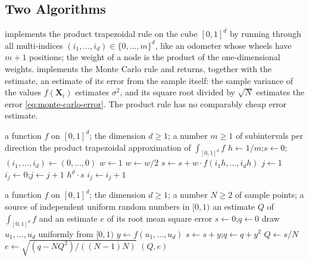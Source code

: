 \subsection{Two Algorithms}

 implements the product trapezoidal rule on the cube $[0,1]^d$ by running through all multi-indices $(i_1,\ldots,i_d)\in\{0,\ldots,m\}^d$, like an odometer whose wheels have $m+1$ positions; the weight of a node is the product of the one-dimensional weights.  implements the Monte Carlo rule and returns, together with the estimate, an estimate of its error from the sample itself: the sample variance of the values $f(\mathbf X_i)$ estimates $\sigma^2$, and its square root divided by $\sqrt N$ estimates the error \eqref{eq:monte-carlo-error}. The product rule has no comparably cheap error estimate.

\begin{algorithm}
\begin{algorithmic}[1]
\Require a function $f$ on $[0,1]^d$; the dimension $d\ge1$; a number $m\ge1$ of subintervals per direction
\Ensure the product trapezoidal approximation of $\int_{[0,1]^d}f$
\State $h\gets1/m$;\quad $s\gets0$;\quad $(i_1,\ldots,i_d)\gets(0,\ldots,0)$
\Loop
  \State $w\gets1$
     $w\gets w/2$ 
    \EndIf
  \EndFor
  \State $s\gets s+w\cdot f(i_1h,\ldots,i_dh)$
  \State $j\gets1$ 
    \State $i_j\gets0$;\quad $j\gets j+1$
  \EndWhile
   \Return $h^d\cdot s$ 
  \EndIf
  \State $i_j\gets i_j+1$
\EndLoop
\end{algorithmic}
\caption{The product trapezoidal rule on the unit cube. The loop body runs $(m+1)^d$ times.}
\label{alg:product-trapezoid}
\end{algorithm}

\begin{algorithm}
\begin{algorithmic}[1]
\Require a function $f$ on $[0,1]^d$; the dimension $d\ge1$; a number $N\ge2$ of sample points; a source of independent uniform random numbers in $[0,1)$
\Ensure an estimate $Q$ of $\int_{[0,1]^d}f$ and an estimate $e$ of its root mean square error
\State $s\gets0$;\quad $q\gets0$
  \State draw $u_1,\ldots,u_d$ uniformly from $[0,1)$
  \State $y\gets f(u_1,\ldots,u_d)$
  \State $s\gets s+y$;\quad $q\gets q+y^2$
\EndFor
\State $Q\gets s/N$
\State $e\gets\sqrt{(q-NQ^2)/((N-1)N)}$ 
\State \Return $(Q,e)$
\end{algorithmic}
\caption{Monte Carlo integration over the unit cube. The cost is $N$ evaluations of $f$ whatever the dimension. Accumulating $q$ as a sum of squares can lose accuracy when the mean is large compared with the spread; Volume~V discusses stable updating formulas.}
\label{alg:monte-carlo}
\end{algorithm}

